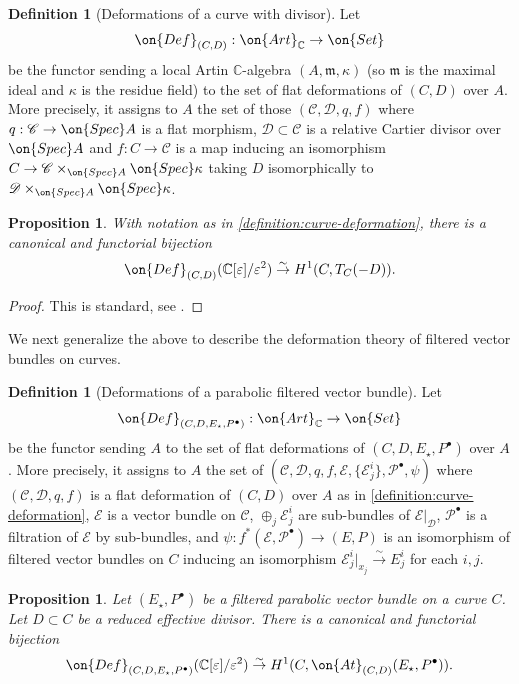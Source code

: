 \documentclass[12 pt]{amsart}
\theoremstyle{plain}
\newtheorem{proposition}[subsubsection]{Proposition}
\theoremstyle{definition}
\newtheorem{definition}[subsubsection]{Definition}
\theoremstyle{remark}
\numberwithin{equation}{section}
\begin{document}
\begin{definition}[Deformations of a curve with divisor]
	\label{definition:curve-deformation}
	Let $$\on{Def}_{(C,D)}: \on{Art}_{\mathbb{C}}\to
\on{Set}$$ be the functor sending a local Artin $\mathbb{C}$-algebra
$(A,\mathfrak m, \kappa)$ (so $\mathfrak m$ is the maximal ideal and $\kappa$ is
the residue field) to the
set of flat deformations of $(C,D)$ over $A$.
More precisely, it assigns to $A$ the set of those
$(\mathscr C, \mathscr D, q, f)$ where
$q: \mathscr C \to \on{Spec} A$ is a flat morphism, $\mathscr D \subset \mathscr C$
is a relative Cartier divisor over $\on{Spec} A$ and $f: C \to \mathscr C$ is a map
inducing an isomorphism $C \to \mathscr C \times_{\on{Spec} A} \on{Spec} \kappa$
taking $D$ isomorphically to $\mathscr D \times_{\on{Spec} A} \on{Spec} \kappa$.
\end{definition}
\begin{proposition}\label{proposition:curve-deformation}
    With notation as in \autoref{definition:curve-deformation}, there is a
    canonical and functorial bijection
    $$\on{Def}_{(C,D)}(\mathbb{C}[\varepsilon]/\varepsilon^2)\overset{\sim}{\to} H^1(C, T_C(-D)).$$
\end{proposition}
\begin{proof}
This is standard, see 
\cite[Proposition 3.4.17]{sernesi:deformations-of-algebraic-schemes}.
\end{proof}
We next generalize the above to describe the deformation theory of filtered
vector bundles on curves.
\begin{definition}[Deformations of a parabolic filtered vector bundle]
	\label{definition:}
	Let
$$\on{Def}_{(C,D, {E_\star}, P^\bullet)}:\on{Art}_{\mathbb{C}}\to \on{Set}$$ be the functor
sending $A$ to the set of flat deformations of $(C, D, E_\star, P^\bullet)$ over $A$.
More precisely, it assigns to $A$ the set of
$(\mathscr C, \mathscr D, q, f, \mathscr E, \{\mathscr E^i_j\}, \mathscr{P}^\bullet, \psi)$
where $(\mathscr C, \mathscr D, q, f)$ is a flat deformation of $(C,D)$ over $A$
as in \autoref{definition:curve-deformation}, $\mathscr E$ is a vector bundle on $\mathscr C$, 
$\oplus_j\mathscr E^i_j$ are sub-bundles of $\mathscr{E}|_\mathscr D$,
$\mathscr{P}^\bullet$ is a filtration of $\mathscr{E}$ by sub-bundles, 
and $\psi: f^* (\mathscr E,  \mathscr{P}^\bullet) \to (E,
 P)$ is an isomorphism of filtered vector bundles on $C$ inducing an isomorphism $\mathscr{E}^i_j|_{x_j}\overset{\sim}{\to} E^i_j$ for each $i,j$.
\end{definition}
\begin{proposition}\label{proposition:filtered-bundle-deformation}
    Let $(E_\star, P^\bullet)$ be a filtered parabolic vector bundle on a curve $C$. Let $D\subset C$ be a reduced effective divisor. 
    There is a canonical and functorial bijection $$\on{Def}_{(C, D, E_\star,
    P^\bullet)}(\mathbb{C}[\varepsilon]/\varepsilon^2)\overset{\sim}{\to} H^1(C,
    \on{At}_{(C,D)}(E_\star,P^\bullet)).$$
\end{proposition}
\end{document}
